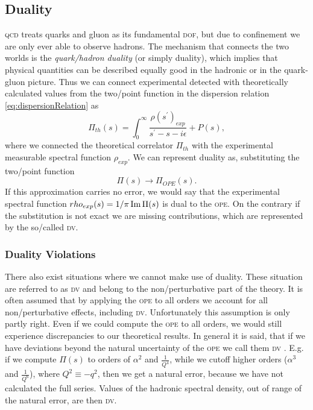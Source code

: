\documentclass[../../index.tex]{subfiles}
\begin{document}
\subsection{Duality}
\label{sec:duality}
\textsc{qcd} treats quarks and gluon as its fundamental \textsc{dof}, but due to
confinement we are only ever able to observe hadrons. The mechanism that
connects the two worlds is the \textit{quark\-/hadron duality} (or simply
duality), which implies that physical quantities can be described equally good
in the hadronic or in the quark-gluon picture. Thus we can connect experimental
detected with theoretically calculated values from the two\-/point function in
the dispersion relation \cref{eq:dispersionRelation} as
\begin{equation}
  \Pi_{th}(s) = \int_0^\infty \frac{\rho(s^\prime)_{exp}}{s^\prime-s-i\epsilon} + P(s),
\end{equation}
where we connected the theoretical correlator \(\Pi_{th}\) with the experimental
measurable spectral function \(\rho_{exp}\). We can represent duality as,
substituting the two\-/point function \cite{Cata2005}
\begin{equation}
  \Pi(s) \to \Pi_{OPE}(s).
\end{equation}
If this approximation carries no error, we would say that the experimental
spectral function \(rho_{exp}(s) = 1/\pi \operatorname{Im} \Pi(s)\) is dual to the
\textsc{ope}. On the contrary if the substitution is not exact we are missing
contributions, which are represented by the so\-/called \textsc{dv}.


\subsubsection{Duality Violations}
There also exist situations where we cannot make use of duality. These situation
are referred to as \textsc{dv} and belong to the
non\-/perturbative part of the theory. It is often assumed that by applying the
\textsc{ope} to all orders we account for all non\-/perturbative effects,
including \textsc{dv}. Unfortunately this assumption is only partly right. Even
if we could compute the \textsc{ope} to all orders, we would still experience
discrepancies to our theoretical results. In general it is said, that if we have
deviations beyond the natural uncertainty of the \textsc{ope} we call them
\textsc{dv} \cite{Shifman2000}. E.g. if we compute \(\Pi(s)\) to orders of
\(\alpha^2\) and \(\frac{1}{Q^4}\), while we cutoff higher orders (\(\alpha^3\)
and \(\frac{1}{Q^6}\)), where \(Q^2 \equiv -q^2\), then we get a natural error,
because we have not calculated the full series. Values of the hadronic spectral
density, out of range of the natural error, are then \textsc{dv}.
\end{document}
